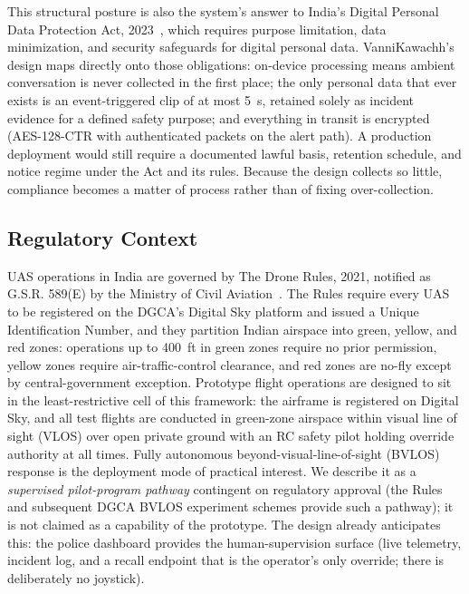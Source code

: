 \documentclass[journal]{IEEEtran}
\begin{document}
This structural posture is also the system's answer to India's Digital
Personal Data Protection Act, 2023~\cite{dpdp2023}, which requires purpose
limitation, data minimization, and security safeguards for digital personal
data. VanniKawachh's design maps directly onto those obligations: on-device
processing means ambient conversation is never collected in the first place;
the only personal data that ever exists is an event-triggered clip of at
most 5~s, retained solely as incident evidence for a defined safety purpose;
and everything in transit is encrypted (AES-128-CTR with authenticated
packets on the alert path). A production deployment would still require a
documented lawful basis, retention schedule, and notice regime under the Act
and its rules. Because the design collects so little, compliance becomes a
matter of process rather than of fixing over-collection.

\subsection{Regulatory Context}

UAS operations in India are governed by The Drone Rules, 2021, notified as
G.S.R. 589(E) by the Ministry of Civil Aviation~\cite{dronerules2021}. The
Rules require every UAS to be registered on the DGCA's Digital Sky platform
and issued a Unique Identification Number, and they partition Indian
airspace into green, yellow, and red zones: operations up to 400~ft in green
zones require no prior permission, yellow zones require air-traffic-control
clearance, and red zones are no-fly except by central-government exception.
Prototype flight operations are designed to sit in the least-restrictive
cell of this framework: the airframe is registered on Digital Sky, and all
test flights are conducted in green-zone airspace within visual line of
sight (VLOS) over open private ground with an RC safety pilot holding
override authority at all times. Fully autonomous
beyond-visual-line-of-sight (BVLOS) response is the deployment mode of
practical interest. We describe it as a \emph{supervised pilot-program
pathway} contingent on regulatory approval (the Rules and subsequent DGCA
BVLOS experiment schemes provide such a pathway); it is not claimed as a
capability of the prototype. The design already anticipates this: the police
dashboard provides the human-supervision surface (live telemetry,
incident log, and a recall endpoint that is the operator's only
override; there is deliberately no joystick).
\end{document}
